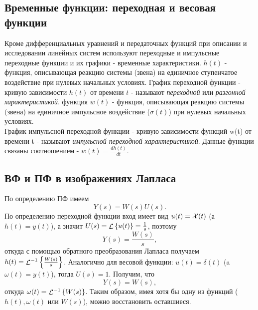 \documentclass[../../TAU.tex]{subfiles}
\begin{document}
\subsection{Временные функции: переходная и весовая функции} %
    Кроме дифференциальных уравнений и передаточных функций при описании и исследовании линейных систем используют переходные и импульсные переходные функции и их графики - временные характеристики.
     $h(t)$  - функция, описывающая реакцию системы (звена) на единичное ступенчатое воздействие при нулевых начальных условиях. 
    График переходной функции - кривую зависимости $h(t)$ от времени $t$ - называют {\it переходной} или {\it разгонной характеристикой}.
     функция $w(t)$ - функция, описывающая реакцию системы (звена) на единичное импульсное воздействие ($\sigma(t)$) при нулевых начальных условиях.\\ 
    График импульсной переходной функции - кривую зависимости функций w(t) от времени t - называют {\it импульсной переходной характеристикой}.
    Данные функции связаны соотношением - $w(t) = \frac{dh(t)}{dt}$.

\subsection{ВФ и ПФ в изображениях Лапласа } %
    По определению ПФ имеем
    $$
        Y(s) = W(s)U(s).
    $$
    По определению переходной функции вход имеет вид 
    $u(t) = \mathcal{X}(t)$ 
    (а~$h(t) = y(t)$), а значит 
    $U(s) = \mathop{\mathcal{L}}\nolimits\left\{u(t)\right\} = \frac{1}{s}$, поэтому
    $$
        Y(s) = \frac{W(s)}{s},
    $$
    откуда с помощью обратного преобразования Лапласа получаем 
    $h(t) = {\mathop{\mathcal{L}}\nolimits^{-1}\left\{\frac{W(s)}{s}\right\}}$.
    Аналогично для весовой функции: 
    $u(t) = \delta(t)$ 
    (a $\omega(t) = y(t)$), тогда $U(s)=1$. Получим, что
    $$
        Y(s) = W(s),
    $$
    откуда 
    $\omega(t) = {\mathop{\mathcal{L}}\nolimits^{-1}\left\{W(s)\right\}}$.
    Таким образом, имея хотя бы одну из функций ($h(t), \omega(t)$ или $W(s)$), можно восстановить оставшиеся.
\end{document}
